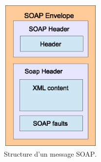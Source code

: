 \begin{figure}[h]
    \centering
    \includegraphics[width=0.45\textwidth]{figs/soap-message-structure.eps}
    \caption{Structure d'un message \textsc{SOAP}.}
    \label{fig:soap-message-structure}
\end{figure}

